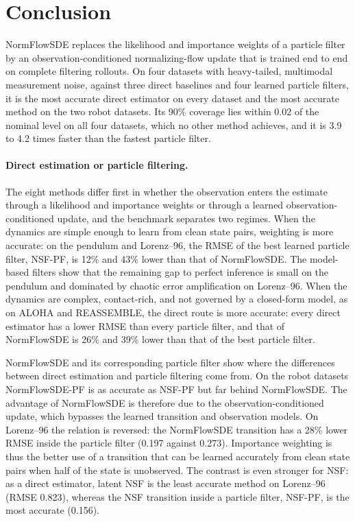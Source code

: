\section{Conclusion}\label{sec:conclusion}
NormFlowSDE replaces the likelihood and importance weights of a particle filter by an observation-conditioned normalizing-flow update that is trained end to end on complete filtering rollouts. On four datasets with heavy-tailed, multimodal measurement noise, against three direct baselines and four learned particle filters, it is the most accurate direct estimator on every dataset and the most accurate method on the two robot datasets. Its 90\% coverage lies within 0.02 of the nominal level on all four datasets, which no other method achieves, and it is 3.9 to 4.2 times faster than the fastest particle filter.

\paragraph{Direct estimation or particle filtering.}
The eight methods differ first in whether the observation enters the estimate through a likelihood and importance weights or through a learned observation-conditioned update, and the benchmark separates two regimes. When the dynamics are simple enough to learn from clean state pairs, weighting is more accurate: on the pendulum and Lorenz--96, the RMSE of the best learned particle filter, NSF-PF, is 12\% and 43\% lower than that of NormFlowSDE. The model-based filters show that the remaining gap to perfect inference is small on the pendulum and dominated by chaotic error amplification on Lorenz--96. When the dynamics are complex, contact-rich, and not governed by a closed-form model, as on ALOHA and REASSEMBLE, the direct route is more accurate: every direct estimator has a lower RMSE than every particle filter, and that of NormFlowSDE is 26\% and 39\% lower than that of the best particle filter.

NormFlowSDE and its corresponding particle filter show where the differences between direct estimation and particle filtering come from. On the robot datasets NormFlowSDE-PF is as accurate as NSF-PF but far behind NormFlowSDE. The advantage of NormFlowSDE is therefore due to the observation-conditioned update, which bypasses the learned transition and observation models. On Lorenz--96 the relation is reversed: the NormFlowSDE transition has a 28\% lower RMSE inside the particle filter (0.197 against 0.273). Importance weighting is thus the better use of a transition that can be learned accurately from clean state pairs when half of the state is unobserved. The contrast is even stronger for NSF: as a direct estimator, latent NSF is the least accurate method on Lorenz--96 (RMSE 0.823), whereas the NSF transition inside a particle filter, NSF-PF, is the most accurate (0.156).

